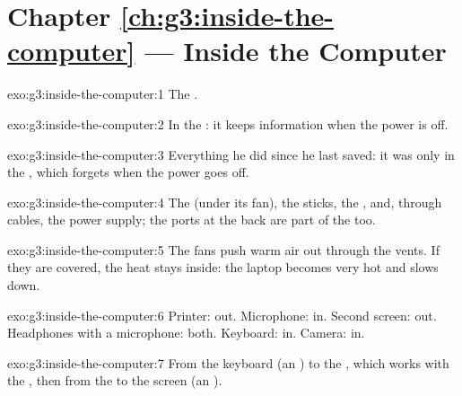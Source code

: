 \section*{Chapter \ref{ch:g3:inside-the-computer} --- Inside the Computer}

\begin{solution}{exo:g3:inside-the-computer:1}
The .
\end{solution}

\begin{solution}{exo:g3:inside-the-computer:2}
In the : it keeps information when the power is off.
\end{solution}

\begin{solution}{exo:g3:inside-the-computer:3}
Everything he did since he last saved: it was only in the , which forgets
when the power goes off.
\end{solution}

\begin{solution}{exo:g3:inside-the-computer:4}
The  (under its fan), the  sticks, the , and, through
cables, the power supply; the ports at the back are part of the  too.
\end{solution}

\begin{solution}{exo:g3:inside-the-computer:5}
The fans push warm air out through the vents. If they are covered, the heat
stays inside: the laptop becomes very hot and slows down.
\end{solution}

\begin{solution}{exo:g3:inside-the-computer:6}
Printer: out. Microphone: in. Second screen: out. Headphones with a microphone:
both. Keyboard: in. Camera: in.
\end{solution}

\begin{solution}{exo:g3:inside-the-computer:7}
From the keyboard (an ) to the , which works with the
, then from the  to the screen (an ).
\end{solution}

